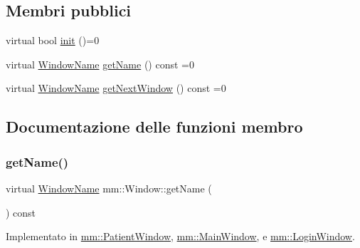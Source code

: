 \subsection*{Membri pubblici}
\begin{DoxyCompactItemize}
\item 
virtual bool \hyperlink{classmm_1_1_window_aba03fbf4761b2f106352baecf5996e10}{init} ()=0
\item 
virtual \hyperlink{namespacemm_a4e9d92e04f65dbf2fc1963947da0d93c}{Window\+Name} \hyperlink{classmm_1_1_window_a942c9125bf42156a9f7b7f561e412fed}{get\+Name} () const =0
\item 
virtual \hyperlink{namespacemm_a4e9d92e04f65dbf2fc1963947da0d93c}{Window\+Name} \hyperlink{classmm_1_1_window_a0cd7b4b0feb9505c44503547a161fcd8}{get\+Next\+Window} () const =0
\end{DoxyCompactItemize}


\subsection{Documentazione delle funzioni membro}
\mbox{\label{classmm_1_1_window_a942c9125bf42156a9f7b7f561e412fed}} 
\subsubsection{\texorpdfstring{get\+Name()}{getName()}}
{\footnotesize\ttfamily virtual \hyperlink{namespacemm_a4e9d92e04f65dbf2fc1963947da0d93c}{Window\+Name} mm\+::\+Window\+::get\+Name (\begin{DoxyParamCaption}{ }\end{DoxyParamCaption}) const\hspace{0.3cm}{\ttfamily [pure virtual]}}



Implementato in \hyperlink{classmm_1_1_patient_window_ab951ab5bf21df2b9450496c6faca5268}{mm\+::\+Patient\+Window}, \hyperlink{classmm_1_1_main_window_a8cfdfeb6ad47afff06fa6b1b7fdc0c88}{mm\+::\+Main\+Window}, e \hyperlink{classmm_1_1_login_window_aa0597e725bfb2df984f526112080aaf7}{mm\+::\+Login\+Window}.

\mbox{\label{classmm_1_1_window_a0cd7b4b0feb9505c44503547a161fcd8}} 
